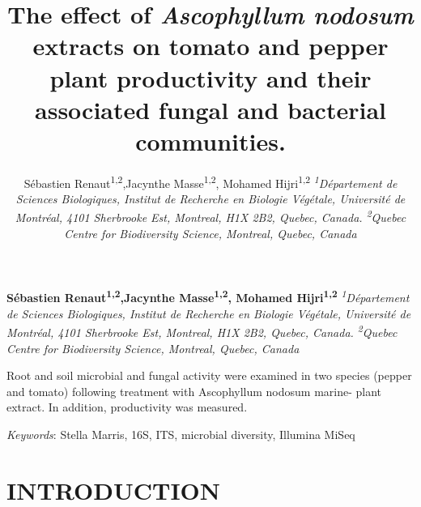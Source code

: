 \documentclass[11pt,]{article}
\title{\textbf{The effect of \emph{Ascophyllum nodosum} extracts on tomato and
pepper plant productivity and their associated fungal and bacterial
communities.}  }
\author{\Large Sébastien Renaut\textsuperscript{1,2},Jacynthe
Masse\textsuperscript{1,2}, Mohamed Hijri\textsuperscript{1,2}\vspace{0.05in} \newline\normalsize\emph{\textsuperscript{1}Département de Sciences Biologiques, Institut de
Recherche en Biologie Végétale, Université de Montréal, 4101 Sherbrooke
Est, Montreal, H1X 2B2, Quebec, Canada. \textsuperscript{2}Quebec Centre
for Biodiversity Science, Montreal, Quebec, Canada}  }
\date{}
\newcommand*{\authorfont}{\fontfamily{phv}\selectfont}
\renewenvironment{abstract}
 {{%
    \setlength{\leftmargin}{0mm}
    \setlength{\rightmargin}{\leftmargin}%
  }%
  \relax}
 {\endlist}
\begin{document}
	
%

{%
\setlength{\parindent}{0pt}
\thispagestyle{plain}
{\fontsize{18}{20}\selectfont\raggedright 
\maketitle  %

}

{
   \vskip 13.5pt\relax \normalsize\fontsize{11}{12} 
\textbf{\authorfont Sébastien Renaut\textsuperscript{1,2},Jacynthe
Masse\textsuperscript{1,2}, Mohamed Hijri\textsuperscript{1,2}} \hskip 15pt \emph{\small \textsuperscript{1}Département de Sciences Biologiques, Institut de
Recherche en Biologie Végétale, Université de Montréal, 4101 Sherbrooke
Est, Montreal, H1X 2B2, Quebec, Canada. \textsuperscript{2}Quebec Centre
for Biodiversity Science, Montreal, Quebec, Canada}   

}

}








\begin{abstract}

    \hbox{\vrule height .2pt width 39.14pc}

    \vskip 8.5pt %

\noindent Root and soil microbial and fungal activity were examined in two species
(pepper and tomato) following treatment with Ascophyllum nodosum marine-
plant extract. In addition, productivity was measured.


\vskip 8.5pt \noindent \emph{Keywords}: Stella Marris, 16S, ITS, microbial diversity, Illumina MiSeq \par

    \hbox{\vrule height .2pt width 39.14pc}



\end{abstract}


\vskip 6.5pt


\noindent \doublespacing \newpage 

\section{INTRODUCTION}\label{introduction}
\end{document}
